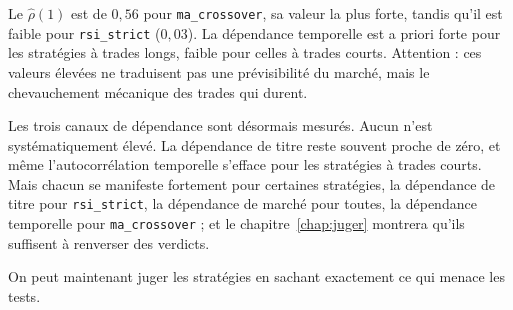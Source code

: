 Le $\hat\rho(1)$ est de $0{,}56$ pour \texttt{ma\_crossover}, sa valeur la plus
forte, tandis qu'il est faible pour \texttt{rsi\_strict} ($0{,}03$).
La dépendance temporelle est a priori forte pour les stratégies
à trades longs, faible pour celles à trades courts. Attention :
ces valeurs élevées ne traduisent pas une prévisibilité du
marché, mais le chevauchement mécanique des trades qui durent.

Les trois canaux de dépendance sont désormais mesurés. Aucun n'est
systématiquement élevé. La dépendance de titre reste souvent proche de zéro,
et même l'autocorrélation temporelle s'efface pour les stratégies à trades
courts. Mais chacun se manifeste fortement pour certaines stratégies, la
dépendance de titre pour \texttt{rsi\_strict}, la dépendance de marché pour
toutes, la dépendance temporelle pour \texttt{ma\_crossover} ; et le
chapitre~\ref{chap:juger} montrera qu'ils suffisent à renverser des verdicts.

On peut maintenant juger les stratégies en sachant exactement ce qui menace
les tests.

